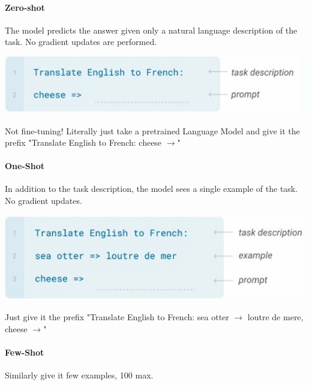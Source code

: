 \documentclass[10pt]{report}
\begin{document}
\paragraph{Zero-shot} The model predicts the answer given only a natural language description of the task. No gradient updates are performed.
\begin{center}
	\includegraphics[scale=0.5]{84.png}
\end{center}
Not fine-tuning! Literally just take a pretrained Language Model and give it the prefix "Translate English to French: cheese $\rightarrow$"
\paragraph{One-Shot} In addition to the task description, the model sees a single example of the task. No gradient updates.
\begin{center}
	\includegraphics[scale=0.5]{85.png}
\end{center}
Just give it the prefix "Translate English to French: sea otter $\rightarrow$ loutre de mere, cheese $\rightarrow$"
\paragraph{Few-Shot} Similarly give it few examples, 100 max.
\end{document}
